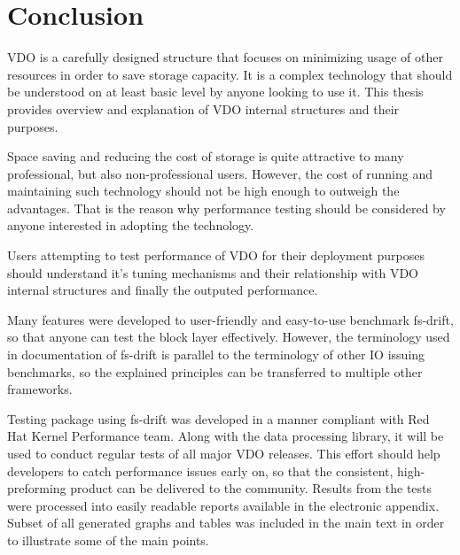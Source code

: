 \documentclass[
  color, %
  table, %
  lof,   %
  lot,   %
]{fithesis3}
\begin{document}



\chapter{Conclusion}
\label{conclusion}

VDO is a carefully designed structure that focuses on minimizing usage of other resources in order to save storage capacity. It is a complex technology that should be understood on at least basic level by anyone looking to use it. This thesis provides overview and explanation of VDO internal structures and their purposes.

Space saving and reducing the cost of storage is quite attractive to many professional, but also non-professional users. However, the cost of running and maintaining such technology should not be high enough to outweigh the advantages. That is the reason why performance testing should be considered by anyone interested in adopting the technology.

Users attempting to test performance of VDO for their deployment purposes should understand it's tuning mechanisms and their relationship with VDO internal structures and finally the outputed performance.

Many features were developed to user-friendly and easy-to-use benchmark fs-drift, so that anyone can test the block layer effectively. However, the terminology used in documentation of fs-drift is parallel to the terminology of other IO issuing benchmarks, so the explained principles can be transferred to multiple other frameworks.

Testing package using fs-drift was developed in a manner compliant with Red Hat Kernel Performance team. Along with the data processing library, it will be used to conduct regular tests of all major VDO releases. This effort should help developers to catch performance issues early on, so that the consistent, high-preforming product can be delivered to the community. Results from the tests were processed into easily readable reports available in the electronic appendix. Subset of all generated graphs and tables was included in the main text in order to illustrate some of the main points.
\end{document}
